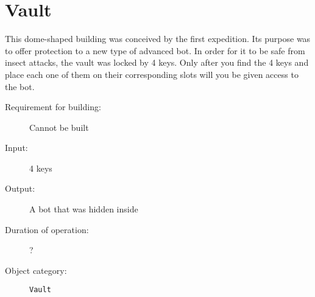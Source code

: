 \section{Vault}

This dome-shaped building was conceived by the first expedition. Its purpose was to offer protection to a new type of advanced bot. In order for it to be safe from insect attacks, the vault was locked by 4 keys. Only after you find the 4 keys and place each one of them on their corresponding slots will you be given access to the bot.

\begin{description}
    \item[Requirement for building:] Cannot be built
    \item[Input:] 4 keys
    \item[Output:] A bot that was hidden inside
    \item[Duration of operation:] ?
    \item[Object category:] \texttt{Vault}
\end{description}
